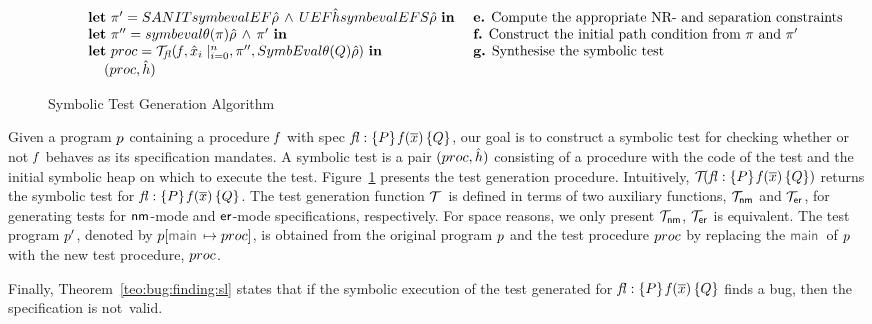 \begin{figure}
{$$\begin{array}{ll}
    \dspc \dspc  \mathbf{let} \ \pc' = SANIT{symbeval{EF}{\sstore}} \, \wedge \,  UEF{\sheap}{symbeval{EFS}{\sstore}}  \ \mathbf{in} 
           & \text{  {\bf e.}  Compute the appropriate NR- and separation constraints}  \\
      \dspc \dspc  \mathbf{let} \ \pc'' = symbeval{\subst(\pc)}{\sstore} \, \wedge \, \pc'  \ \mathbf{in} 
          & \text{  {\bf f.} Construct the initial path condition from $\pc$ and $\pc'$}  \\
       \dspc \dspc  \mathbf{let} \ \proc = \testify{\flag}(\pid, \svar_i\mid_{i=0}^n, \pc'', SymbEval{\subst(Q)}{\sstore})  \ \mathbf{in} 
          & \text{  {\bf g.} Synthesise the symbolic test} \\
      \dspc \dspc \dspc (\proc, \sheap) 
\end{array}
$$}
\vspace*{-0.2cm}
\caption{Symbolic Test Generation Algorithm~\label{fig:test:generation}}
\vspace*{-0.2cm}
\end{figure}

Given a \jsil program $p$ containing a procedure $\mathit{f}$ with spec {\small ${\mathit{fl}} : \{ P \} \, \mathit{f}(\overline{x}) \, \{ Q \}$}, 
our goal is to construct a symbolic test for checking whether or not $\mathit{f}$ behaves as its specification mandates.
A symbolic test is a pair $(proc, \hat{h})$ consisting of a \jsil procedure with the code of the test and the initial 
symbolic heap on which to execute the test. 
%
Figure~\ref{fig:test:generation} presents the test generation procedure. Intuitively, $\mathcal{T}_{}({\mathit{fl}} : \{ P \} \, \mathit{f}(\overline{x}) \, \{ Q \})$ 
returns the symbolic test for ${\mathit{fl}} : \{ P \} \, \mathit{f}(\overline{x}) \, \{ Q \}$. The test generation function $\mathcal{T}_{} \ $ is defined in terms 
of two auxiliary functions, $\mathcal{T}_{{\sf nm}}$ and $\mathcal{T}_{{\sf er}}$, for generating tests for ${\sf nm}$-mode and 
${\sf er}$-mode specifications, respectively. 
For space reasons, we only present $\mathcal{T}_{{\sf nm}}$, $\mathcal{T}_{{\sf er}}$ is equivalent. 
The test program $p'$, denoted by $\prog[\jsilmain \mapsto \proc]$, is obtained from the original program $p$ and the test procedure $proc$ by replacing the 
$\jsilmain$ of $p$ with the new test procedure, $proc$. 

Finally, Theorem~\ref{teo:bug:finding:sl} states that if the symbolic execution of the 
test generated for ${\mathit{fl}} : \{ P \} \, \mathit{f}(\overline{x}) \, \{ Q \}$ finds a bug, then the specification 
is not~valid.

